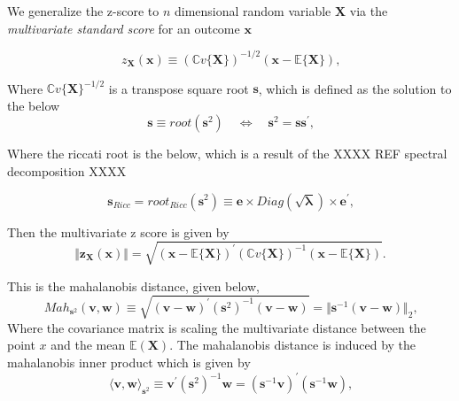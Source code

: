 \documentclass{article}
\theoremstyle{definition}
\theoremstyle{remark}
\begin{document}
\vspace{1cm}

We generalize the z-score to $n$ dimensional random variable $\mathbf{X}$ via 
the \textit{multivariate standard score} for an outcome $\mathbf{x}$

\begin{equation}
    z_{\boldsymbol{X}}\left( \boldsymbol{x}\right) \equiv(\mathbb{C}v\{\boldsymbol{X}\})^{-1/2}(\boldsymbol{x}-\mathbb{E}\{\boldsymbol{X}\})\text{,}
    \end{equation}

Where  $\mathbb{C}v\{\boldsymbol{X}\}^{-1/2}$  is a transpose square root $\mathbf{s}$, which is defined as the solution to the below
\begin{equation}
    \boldsymbol{s}\equiv\mathit{root}(\boldsymbol{s}^{2})\quad\Leftrightarrow \quad\boldsymbol{s}^{2}=\boldsymbol{s}\boldsymbol{s}^{\prime}\text{,}
    \end{equation}

Where the riccati root is the below, which is a result of the
XXXX REF spectral decomposition XXXX

\begin{equation}
    \boldsymbol{s}_{\mathit{Ricc}}=\mathit{root}_{\mathit{Ricc}}(\boldsymbol{s}^{2})\equiv\boldsymbol{e}\times\mathit{Diag}(\sqrt{\boldsymbol{\lambda}})\times\boldsymbol{e}^{\prime}\text{,}
    \end{equation}

Then the multivariate z score is given by 
\begin{equation}
    \Vert\boldsymbol{z}_{\boldsymbol{X}}(\boldsymbol{x})\Vert=\sqrt{(\boldsymbol{x}-\mathbb{E}\{\boldsymbol{X}\})^{\prime}(\mathbb{C}v\{\boldsymbol{X}\})^{-1}(\boldsymbol{x}-\mathbb{E}\{\boldsymbol{X}\})}\text{.}
    \end{equation}

This is the mahalanobis distance, given below,
\begin{equation}
    \mathit{Mah}_{\boldsymbol{s}^{2}}(\boldsymbol{v},\boldsymbol{w})\equiv \sqrt{\left( \boldsymbol{v}-\boldsymbol{w}\right) ^{\prime}(\boldsymbol{s}^{2})^{-1}\left( \boldsymbol{v}-\boldsymbol{w}\right) }=\Vert\boldsymbol{s}^{-1}(\boldsymbol{v}-\boldsymbol{w})\Vert_{2}\text{,}
\end{equation}
Where the covariance matrix is scaling 
the multivariate distance between
the point $x$ and the mean $\mathbb{E}(\mathbf{X})$.
The mahalanobis distance is induced by the mahalanobis
inner product which is given by 
\begin{equation}
    \langle\boldsymbol{v},\boldsymbol{w}\rangle_{\boldsymbol{s}^{2}}\equiv\boldsymbol{v}^{\prime}(\boldsymbol{s}^{2})^{-1}\boldsymbol{w}=(\boldsymbol{s}^{-1}\boldsymbol{v})^{\prime}(\boldsymbol{s}^{-1}\boldsymbol{w})\text{,}
    \end{equation}
\end{document}
